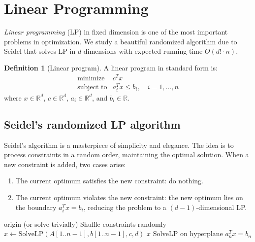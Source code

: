 \documentclass[twoside,12pt]{book}
\theoremstyle{plain}
\theoremstyle{definition}
\newtheorem{definition}[theorem]{Definition}
\theoremstyle{remark}
\begin{document}
\section{Linear Programming}
\label{sec:lp}

\emph{Linear programming} (LP) in fixed dimension is one of the most important problems in optimization. We study a beautiful randomized algorithm due to Seidel that solves LP in $d$ dimensions with expected running time $O(d! \cdot n)$.

\begin{definition}[Linear program]
A linear program in standard form is:
\[
\begin{array}{ll}
\text{minimize} & c^T x \\
\text{subject to} & a_i^T x \leq b_i, \quad i = 1, \ldots, n
\end{array}
\]
where $x \in \mathbb{R}^d$, $c \in \mathbb{R}^d$, $a_i \in \mathbb{R}^d$, and $b_i \in \mathbb{R}$.
\end{definition}

\subsection{Seidel's randomized LP algorithm}

Seidel's algorithm is a masterpiece of simplicity and elegance. The idea is to process constraints in a random order, maintaining the optimal solution. When a new constraint is added, two cases arise:
\begin{enumerate}[nosep]
    \item The current optimum satisfies the new constraint: do nothing.
    \item The current optimum violates the new constraint: the new optimum lies on the boundary $a_i^T x = b_i$, reducing the problem to a $(d-1)$-dimensional LP.
\end{enumerate}

\begin{algorithm}
\caption{Seidel's Randomized LP Algorithm}
\label{alg:seidel-lp}
\begin{algorithmic}[1]
        \State \Return origin (or solve trivially)
    \EndIf
    \State Shuffle constraints randomly
    \State $x \leftarrow \text{SolveLP}(A[1..n-1], b[1..n-1], c, d)$ 
        \State \Return $x$ 
    \Else
        \State \Return $\text{SolveLP on hyperplane } a_n^T x = b_n$ 
    \EndIf
\EndFunction
\end{algorithmic}
\end{algorithm}
\end{document}
